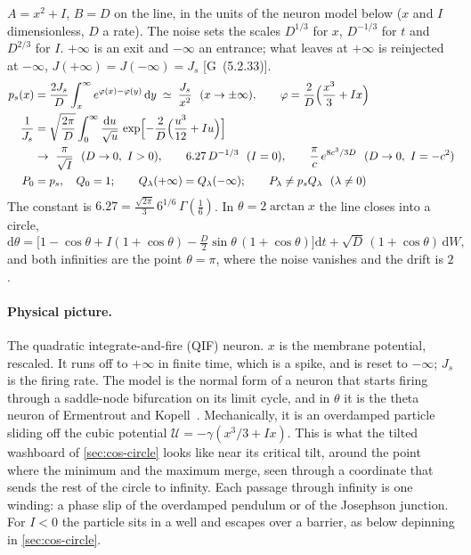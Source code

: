 \documentclass[11pt]{article}
\numberwithin{equation}{section}
\newcommand{\dd}{\mathrm{d}}
\newcommand{\G}[1]{[G~(#1)]}
\begin{document}
\begin{keyresults}
$A=x^2+I$, $B=D$ on the line, in the units of the neuron model below ($x$ and $I$ dimensionless, $D$ a rate). The noise
sets the scales $D^{1/3}$ for $x$, $D^{-1/3}$ for $t$ and $D^{2/3}$ for $I$. $+\infty$ is an exit and $-\infty$ an
entrance; what leaves at $+\infty$ is reinjected at $-\infty$, $J(+\infty)=J(-\infty)=J_s$ \G{5.2.33}.
\begin{align}
  p_s(x) &= \frac{2J_s}{D}\int_x^\infty e^{\varphi(x)-\varphi(y)}\,\dd y\;\simeq\;\frac{J_s}{x^2}\ \ (x\to\pm\infty),
  \qquad \varphi=\frac2D\Bigl(\frac{x^3}3+Ix\Bigr) \\
  \frac1{J_s} &= \sqrt{\frac{2\pi}{D}}\int_0^\infty\frac{\dd u}{\sqrt u}\,
  \exp\Bigl[-\frac2D\Bigl(\frac{u^3}{12}+Iu\Bigr)\Bigr] \\
  &\to\ \frac{\pi}{\sqrt I}\ \ (D\to0,\ I>0),\qquad 6.27\,D^{-1/3}\ \ (I=0),\qquad
  \frac\pi c\,e^{8c^3/3D}\ \ (D\to0,\ I=-c^2) \notag\\
  P_0 &= p_s,\quad Q_0=1;\qquad Q_\lambda(+\infty)=Q_\lambda(-\infty);\qquad P_\lambda\neq p_sQ_\lambda\ \ (\lambda\neq0)
\end{align}
The constant is $6.27=\frac{\sqrt{2\pi}}3\,6^{1/6}\,\Gamma(\frac16)$. In $\theta=2\arctan x$ the line closes into a
circle,
\begin{equation}
  \dd\theta=\bigl[1-\cos\theta+I(1+\cos\theta)-\tfrac D2\sin\theta\,(1+\cos\theta)\bigr]\dd t+\sqrt D\,(1+\cos\theta)\,\dd W,
\end{equation}
and both infinities are the point $\theta=\pi$, where the noise vanishes and the drift is $2$.
\end{keyresults}

\paragraph{Physical picture.} The quadratic integrate-and-fire (QIF) neuron. $x$ is the membrane potential, rescaled.
It runs off to $+\infty$ in finite time, which is a spike, and is reset to $-\infty$; $J_s$ is the firing rate. The
model is the normal form of a neuron that starts firing through a saddle-node bifurcation on its limit cycle, and in
$\theta$ it is the theta neuron of Ermentrout and Kopell~\cite{ermentrout}. Mechanically, it is an overdamped
particle sliding off the cubic potential $\mathcal U=-\gamma(x^3/3+Ix)$. This is what the tilted washboard of
\cref{sec:cos-circle} looks like near its critical tilt, around the point where the minimum and the maximum merge,
seen through a coordinate that sends the rest of the circle to infinity. Each passage through infinity is one
winding: a phase slip of the overdamped pendulum or of the Josephson junction. For $I<0$ the particle sits in a well
and escapes over a barrier, as below depinning in \cref{sec:cos-circle}.
\end{document}
